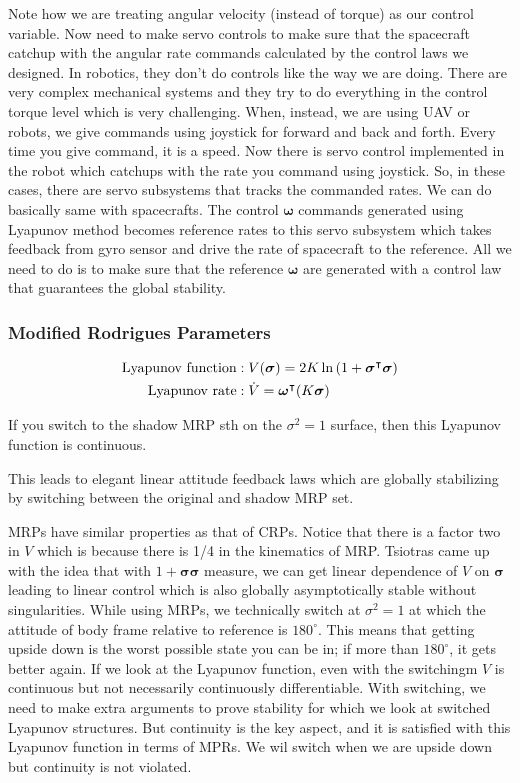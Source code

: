 \documentclass{article}
\begin{document}
Note how we are treating angular velocity (instead of torque) as our control variable. Now need to make servo controls to make sure that the spacecraft catchup with the angular rate commands calculated by the control laws we designed. In robotics, they don't do controls like the way we are doing. There are very complex mechanical systems and they try to do everything in the control torque level which is very challenging. When, instead, we are using UAV or robots, we give commands using joystick for forward and back and forth. Every time you give command, it is a speed. Now there is servo control implemented in the robot which catchups with the rate you command using joystick. So, in these cases, there are servo subsystems that tracks the commanded rates. We can do basically same with spacecrafts. The control $\bm{\omega}$ commands generated using Lyapunov method becomes reference rates to this servo subsystem which takes feedback from gyro sensor and drive the rate of spacecraft to the reference. All we need to do is to make sure that the reference $\bm{\omega}$ are generated with a control law that guarantees the global stability.

\subsubsection{Modified Rodrigues Parameters}

\begin{equation*}
  \begin{split}
    \textnormal{Lyapunov function}&:V(\bm{\sigma})=2K\ln{(1+\bm{\sigma}^{\intercal}\bm{\sigma})}\\
    \textnormal{Lyapunov rate}&:\dot{V}=\bm{\omega}^{\intercal}(K\bm{\sigma})\\
  \end{split}
\end{equation*}

If you switch to the shadow MRP sth on the $\sigma^{2}=1$ surface, then this Lyapunov function is continuous.

This leads to elegant linear attitude feedback laws which are globally stabilizing by switching between the original and shadow MRP set.

MRPs have similar properties as that of CRPs. Notice that there is a factor two in $V$ which is because there is 1/4 in the kinematics of MRP. Tsiotras came up with the idea that with $1+\bm{\sigma}\bm{\sigma}$ measure, we can get linear dependence of $V$ on $\bm{\sigma}$ leading to linear control which is also globally asymptotically stable without singularities. While using MRPs, we technically switch at $\sigma^{2}=1$ at which the attitude of body frame relative to reference is $180^{\circ}$. This means that getting upside down is the worst possible state you can be in; if more than $180^{\circ}$, it gets better again. If we look at the Lyapunov function, even with the switchingm $V$ is continuous but not necessarily continuously differentiable. With switching, we need to make extra arguments to prove stability for which we look at switched Lyapunov structures. But continuity is the key aspect, and it is satisfied with this Lyapunov function in terms of MPRs. We wil switch when we are upside down but continuity is not violated.
\end{document}
